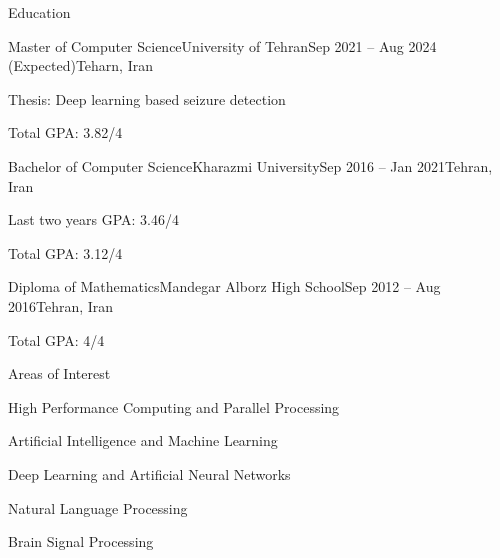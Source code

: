 \documentclass[]{main}
\begin{document}
\resumeheader
{}
{}
{}
{}
{}
{}

\begin{section}{Education}
 \begin{subsectionnobullet}{Master of Computer Science}{University of Tehran}{Sep 2021 -- Aug 2024 (Expected)}{Teharn, Iran}
     \item Thesis: Deep learning based seizure detection
     \item Total GPA: 3.82/4
 \end{subsectionnobullet}
 \begin{subsectionnobullet}{Bachelor of Computer Science}{Kharazmi University}{Sep 2016 -- Jan 2021}{Tehran, Iran}
     \item Last two years GPA: 3.46/4
     \item Total GPA: 3.12/4
 \end{subsectionnobullet}
 \begin{subsectionnobullet}{Diploma of Mathematics}{Mandegar Alborz High School}{Sep 2012 -- Aug 2016}{Tehran, Iran}
     \item Total GPA: 4/4
 \end{subsectionnobullet}
\end{section}

\begin{section}{Areas of Interest}
 \begin{subsectionbullet}
     \item High Performance Computing and Parallel Processing
     \item Artificial Intelligence and Machine Learning
     \item Deep Learning and Artificial Neural Networks
     \item Natural Language Processing
     \item Brain Signal Processing
 \end{subsectionbullet}
\end{section}
\end{document}

